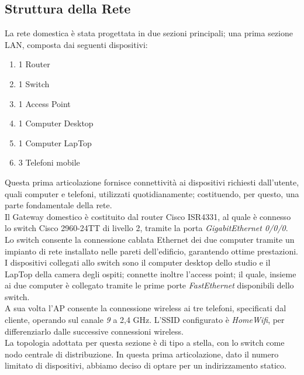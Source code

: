 \documentclass[italian, 12pt, a4paper]{article}
\begin{document}
\subsection{Struttura della Rete}
La rete domestica è stata progettata in due sezioni principali; una prima sezione LAN, composta dai seguenti dispositivi: \begin{enumerate}
    \item 1 Router
    \item 1 Switch
    \item 1 Access Point
    \item 1 Computer Desktop
    \item 1 Computer LapTop
    \item 3 Telefoni mobile
\end{enumerate}
Questa prima articolazione fornisce connettività ai dispositivi richiesti dall'utente, quali computer e telefoni, utilizzati quotidianamente; costituendo, per questo, una parte fondamentale della rete. \\Il Gateway domestico è costituito dal router Cisco ISR4331, al quale è connesso lo switch Cisco 2960-24TT di livello 2, tramite la porta \emph{GigabitEthernet 0/0/0}. Lo switch consente la connessione cablata Ethernet dei due computer tramite un impianto di rete installato nelle pareti dell'edificio, garantendo ottime prestazioni. I dispositivi collegati allo switch sono il computer desktop dello studio e il LapTop della camera degli ospiti; connette inoltre l'access point;  il quale, insieme ai due computer è collegato tramite le prime porte \emph{FastEthernet} disponibili dello switch.\\A sua volta l'AP consente la connessione wireless ai tre telefoni, specificati dal cliente, operando sul canale \emph{9} a 2,4 GHz. L'SSID configurato è \emph{HomeWifi}, per differenziarlo dalle successive connessioni wireless.\\La topologia adottata per questa sezione è di tipo a stella, con lo switch come nodo centrale di distribuzione. In questa prima articolazione, dato il numero limitato di dispositivi, abbiamo deciso di optare per un indirizzamento statico.\\\\
\end{document}

